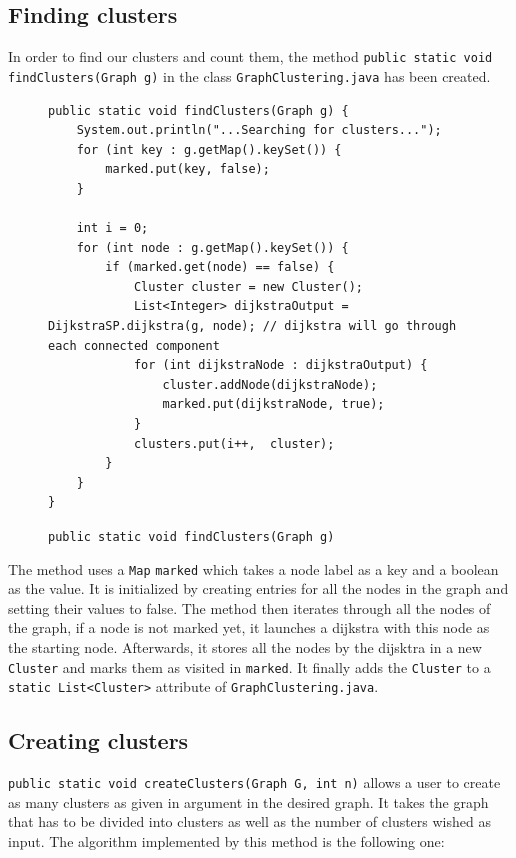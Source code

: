 \documentclass{article}
\begin{document}
\subsection{Finding clusters}

In order to find our clusters and count them, the method \texttt{public static void findClusters(Graph g)} in the class \texttt{GraphClustering.java} has been created. 

\begin{figure}[h]
\begin{verbatim}
public static void findClusters(Graph g) {
	System.out.println("...Searching for clusters...");
	for (int key : g.getMap().keySet()) {
		marked.put(key, false);
	}
	
	int i = 0;
	for (int node : g.getMap().keySet()) {
		if (marked.get(node) == false) {
			Cluster cluster = new Cluster();
			List<Integer> dijkstraOutput = DijkstraSP.dijkstra(g, node); // dijkstra will go through each connected component
			for (int dijkstraNode : dijkstraOutput) {
				cluster.addNode(dijkstraNode);
				marked.put(dijkstraNode, true);
			}
			clusters.put(i++,  cluster);
		}
	}
}
\end{verbatim}
\caption{\texttt{public static void findClusters(Graph g)}}
\end{figure}
The method uses a \texttt{Map} \texttt{marked} which takes a node label as a key and a boolean as the value. It is initialized by creating entries for all the nodes in the graph and setting their values to false. The method then iterates through all the nodes of the graph, if a node is not marked yet, it launches a dijkstra with this node as the starting node. Afterwards, it stores all the nodes by the dijsktra in a new \texttt{Cluster} and marks them as visited in \texttt{marked}. It finally adds the \texttt{Cluster} to a \texttt{static List<Cluster>} attribute of \texttt{GraphClustering.java}.

\subsection{Creating clusters}

\texttt{public static void createClusters(Graph G, int n)} allows a user to create as many clusters as given in argument in the desired graph. It takes the graph that has to be divided into clusters as well as the number of clusters wished as input.
The algorithm implemented by this method is the following one:
\end{document}

